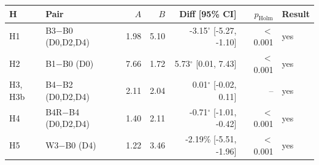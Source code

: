 \begin{tabular}{llrrrrl}
\toprule
H & Pair & $A$ & $B$ & Diff [95\% CI] & $p_{\mathrm{Holm}}$ & Result \\
\midrule
H1 & B3$-$B0 (D0,D2,D4) & 1.98 & 5.10 & -3.15$^\circ$ [-5.27, -1.10] & $<$0.001 & yes \\
H2 & B1$-$B0 (D0) & 7.66 & 1.72 & 5.73$^\circ$ [0.01, 7.43] & $<$0.001 & yes \\
H3, H3b & B4$-$B2 (D0,D2,D4) & 2.11 & 2.04 & 0.01$^\circ$ [-0.02, 0.11] & -- & yes \\
H4 & B4R$-$B4 (D0,D2,D4) & 1.40 & 2.11 & -0.71$^\circ$ [-1.01, -0.42] & $<$0.001 & yes \\
H5 & W3$-$B0 (D4) & 1.22 & 3.46 & -2.19\% [-5.51, -1.96] & $<$0.001 & yes \\
\bottomrule
\end{tabular}